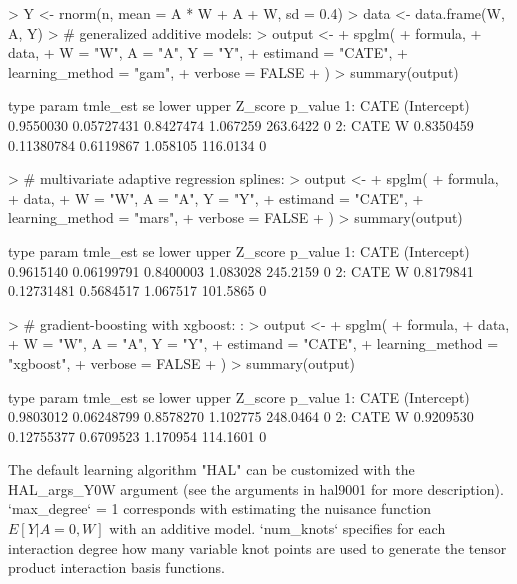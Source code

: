 \documentclass{article}
\begin{document}
\begin{Schunk}
\begin{Sinput}
> Y <- rnorm(n, mean = A * W + A + W, sd = 0.4)
> data <- data.frame(W, A, Y)
> # generalized additive models:
> output <-
+   spglm(
+     formula,
+     data,
+     W = "W", A = "A", Y = "Y",
+     estimand = "CATE",
+     learning_method = "gam",
+     verbose = FALSE
+   )
> summary(output)
\end{Sinput}
\begin{Soutput}
   type       param  tmle_est         se     lower    upper  Z_score p_value
1: CATE (Intercept) 0.9550030 0.05727431 0.8427474 1.067259 263.6422       0
2: CATE           W 0.8350459 0.11380784 0.6119867 1.058105 116.0134       0
\end{Soutput}
\begin{Sinput}
> # multivariate adaptive regression splines:
> output <-
+   spglm(
+     formula,
+     data,
+     W = "W", A = "A", Y = "Y",
+     estimand = "CATE",
+     learning_method = "mars",
+     verbose = FALSE
+   )
> summary(output)
\end{Sinput}
\begin{Soutput}
   type       param  tmle_est         se     lower    upper  Z_score p_value
1: CATE (Intercept) 0.9615140 0.06199791 0.8400003 1.083028 245.2159       0
2: CATE           W 0.8179841 0.12731481 0.5684517 1.067517 101.5865       0
\end{Soutput}
\begin{Sinput}
> # gradient-boosting with xgboost: :
> output <-
+   spglm(
+     formula,
+     data,
+     W = "W", A = "A", Y = "Y",
+     estimand = "CATE",
+     learning_method = "xgboost",
+     verbose = FALSE
+   )
> summary(output)
\end{Sinput}
\begin{Soutput}
   type       param  tmle_est         se     lower    upper  Z_score p_value
1: CATE (Intercept) 0.9803012 0.06248799 0.8578270 1.102775 248.0464       0
2: CATE           W 0.9209530 0.12755377 0.6709523 1.170954 114.1601       0
\end{Soutput}
\end{Schunk}


The default learning algorithm "HAL" can be customized with the HAL\_args\_Y0W argument (see the arguments in hal9001 for more description). `max\_degree` = 1 corresponds with estimating the nuisance function $E[Y|A=0,W]$ with an additive model. `num\_knots` specifies for each interaction degree how many variable knot points are used to generate the tensor product interaction basis functions. 
\end{document}
